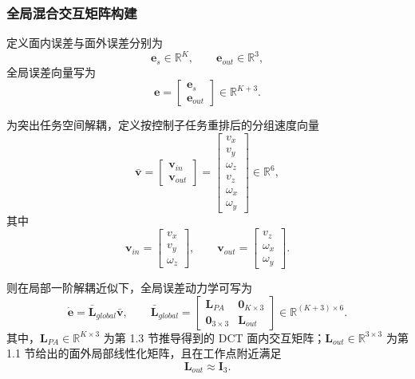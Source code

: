 \documentclass{article}
\begin{document}
\subsubsection{全局混合交互矩阵构建}

定义面内误差与面外误差分别为
\begin{equation}
\mathbf{e}_{s} \in \mathbb{R}^{K}, \qquad
\mathbf{e}_{out} \in \mathbb{R}^{3},
\end{equation}
全局误差向量写为
\begin{equation}
\mathbf{e} =
\begin{bmatrix}
\mathbf{e}_{s} \\ \mathbf{e}_{out}
\end{bmatrix}
\in \mathbb{R}^{K+3}.
\end{equation}

为突出任务空间解耦，定义按控制子任务重排后的分组速度向量
\begin{equation}
\bar{\mathbf{v}} =
\begin{bmatrix}
\mathbf{v}_{in} \\ \mathbf{v}_{out}
\end{bmatrix}
=
\begin{bmatrix}
v_x \\ v_y \\ \omega_z \\ v_z \\ \omega_x \\ \omega_y
\end{bmatrix}
\in \mathbb{R}^{6},
\end{equation}
其中
\begin{equation}
\mathbf{v}_{in} =
\begin{bmatrix}
v_x \\ v_y \\ \omega_z
\end{bmatrix},
\qquad
\mathbf{v}_{out} =
\begin{bmatrix}
v_z \\ \omega_x \\ \omega_y
\end{bmatrix}.
\end{equation}

则在局部一阶解耦近似下，全局误差动力学可写为
\begin{equation}
\dot{\mathbf{e}} = \bar{\mathbf{L}}_{global}\bar{\mathbf{v}}, \qquad
\bar{\mathbf{L}}_{global} =
\begin{bmatrix}
\mathbf{L}_{PA} & \mathbf{0}_{K\times 3} \\
\mathbf{0}_{3\times 3} & \mathbf{L}_{out}
\end{bmatrix}
\in \mathbb{R}^{(K+3)\times 6}.
\end{equation}
其中，$\mathbf{L}_{PA} \in \mathbb{R}^{K\times 3}$ 为第 1.3 节推导得到的 DCT 面内交互矩阵；$\mathbf{L}_{out} \in \mathbb{R}^{3\times 3}$ 为第 1.1 节给出的面外局部线性化矩阵，且在工作点附近满足
\begin{equation}
\mathbf{L}_{out} \approx \mathbf{I}_{3}.
\end{equation}
\end{document}
